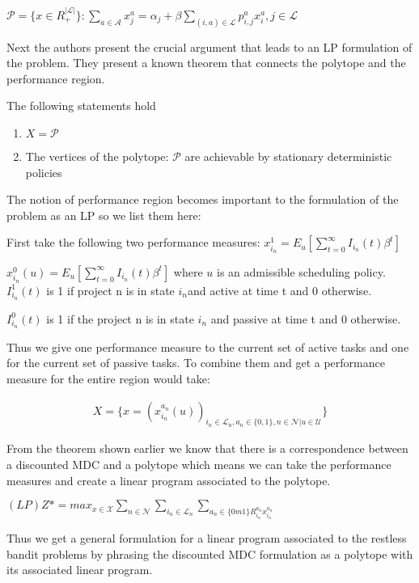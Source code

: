 $\mathcal{P} = \{ x \in R_+^{|\mathcal{L}|} \}: \sum_{a \in \mathcal{A}} x_j^a = \alpha_j 
+ \beta \sum_{(i,a) \in \mathcal{L}} p_{i,j}^a x_i^a, j  \in \mathcal{L}$ 

Next the authors present the crucial argument that leads to an LP formulation of the problem.
They present a known theorem that connects the polytope and the performance region. 

The following statements hold
\begin{enumerate}
\item
 $X = \mathcal{P}$ \\
\item
  The vertices of the polytope: $\mathcal{P}$ are achievable by stationary 
deterministic policies
\end{enumerate} 

The notion of performance region becomes important to the formulation of the problem as an
LP so we list them here:

First take the following two performance measures:
$x_{i_n}^1 = E_u[\sum_{t=0}^{\infty} I_{i_n}(t)\beta^t]$ 

$x_{i_n}^0(u) = E_u[\sum_{t=0}^{\infty}I_{i_n}(t) \beta^t]$ where $u$ is an admissible scheduling policy.  \\

$I_{i_n}^1(t)$ is 1 if project n is in state $i_n$and active at time t and 0 otherwise.

$I_{i_n}^0(t)$ is 1 if the project n is in state $i_n$ and passive at time t and 0 otherwise.

Thus we give one performance measure to the current set of active tasks and one for the current set of passive tasks. To combine them and get a performance measure for the entire region would take: 

\begin{align*}
X = \{x = (x_{i_n}^{a_n}(u))_{i_n \in \mathcal{L}_n, a_n \in \{0,1\}, n \in \mathcal{N}|u \in \mathcal{U}}\}
\end{align*}

From the theorem shown earlier we know that there is a correspondence between a discounted MDC and a polytope which means we can take the performance measures and create a linear program associated to the polytope.

$(LP) Z* = max_{x \in \mathcal{X}} \sum_{n \in \mathcal{N}} \sum_{i_n \in \mathcal{L}_n} 
\sum_{a_n \in \{ 0m1\} R_{i_n}^{a_n} x_{i_n}^{a_n}} $

Thus we get a general formulation for a linear program associated to the restless bandit problems by phrasing the discounted MDC formulation as a polytope with its associated linear program. 
